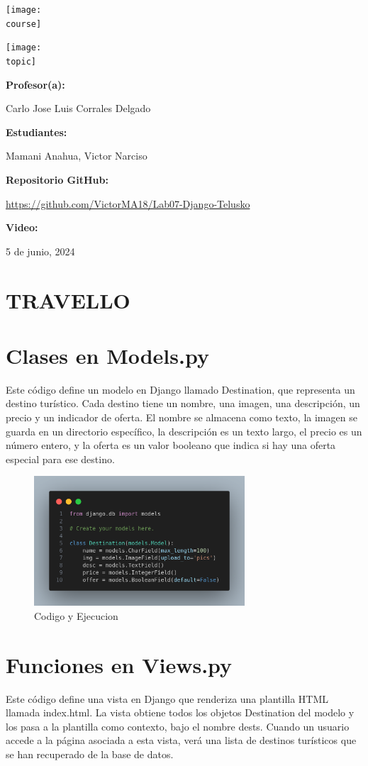\documentclass[10pt, a4paper]{article}
\newcommand{\course}{img/web_programming}
\newcommand{\topic}{img/Django.jpg}
\newcommand{\professor}{Carlo Jose Luis Corrales Delgado}
\newcommand{\students}{Mamani Anahua, Victor Narciso}
\newcommand{\github}{https://github.com/VictorMA18/Lab07-Django-Telusko}
\newcommand{\video}{}
\newcommand{\mydate}{5 de junio, 2024}
\begin{document}
\begin{titlepage}
	\centering
	\texttt{[image: \\course]} \par
  \vfill \vfill
	\texttt{[image: \\topic]}\par
  \vfill \vfill
  {\textbf{Profesor(a):} \par}
	\professor \vfill
  {\textbf{Estudiantes:} \par}
	\students \vfill
  {\textbf{Repositorio GitHub:} \par}
  \href{\github}{\github} \vfill
  {\textbf{Video:} \par}
  \href{\video}{\video} \vfill
	{\large \mydate \par}
\end{titlepage}

\section{TRAVELLO}

\section{Clases en Models.py}
Este código define un modelo en Django llamado Destination, que representa un destino turístico. Cada destino tiene un nombre, una imagen, una descripción, un precio y un indicador de oferta. El nombre se almacena como texto, la imagen se guarda en un directorio específico, la descripción es un texto largo, el precio es un número entero, y la oferta es un valor booleano que indica si hay una oferta especial para ese destino.
\begin{figure}[H]
  \centering
  \includegraphics[width=0.7\textwidth]{img/models-travello.png}
  \caption{Codigo y Ejecucion}
\end{figure}

\section{Funciones en Views.py}
Este código define una vista en Django que renderiza una plantilla HTML llamada index.html. La vista obtiene todos los objetos Destination del modelo y los pasa a la plantilla como contexto, bajo el nombre dests. Cuando un usuario accede a la página asociada a esta vista, verá una lista de destinos turísticos que se han recuperado de la base de datos.
\end{document}

